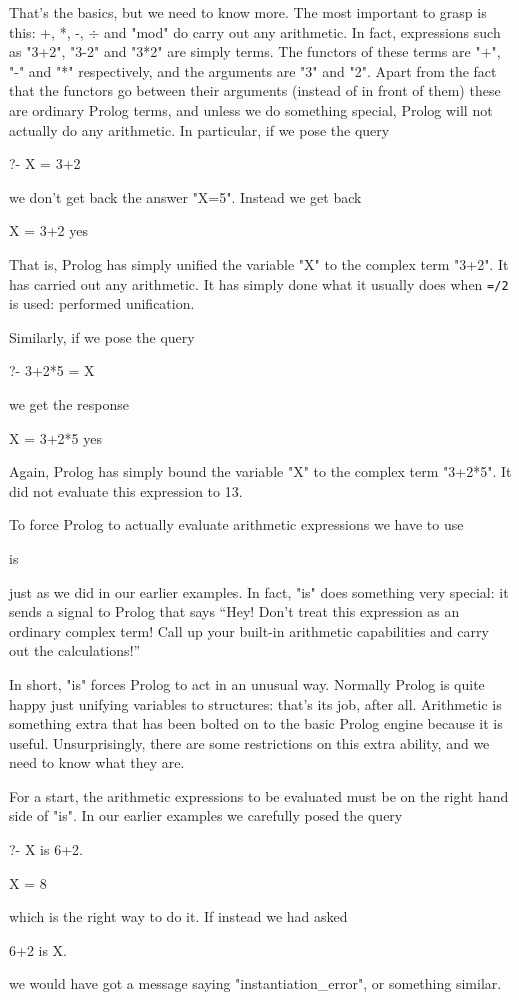 That's the basics, but we need to know more.  The most important to
grasp is this: +, *, -, $\div$ and "mod" do  carry out
any arithmetic.  In fact, expressions such as "3+2", "3-2" and "3*2"
are simply terms.  The functors of these terms are "+", "-" and "*"
respectively, and the arguments are "3" and "2".  Apart from the fact
that the functors go between their arguments (instead of in front of
them) these are ordinary Prolog terms, and unless we do something
special, Prolog will not actually do any arithmetic.  In
particular, if we pose the query
\begin{LPNcodedisplay}
?- X = 3+2
\end{LPNcodedisplay}
we don't get back the answer "X=5".
Instead we get back
\begin{LPNcodedisplay}
X = 3+2
yes
\end{LPNcodedisplay}
That is, Prolog has simply unified the variable "X" to the complex
term "3+2".  It has  carried out any arithmetic.  It has
simply done what it usually does when \texttt{=/2} is used: performed
unification.

Similarly,
if we pose the query
\begin{LPNcodedisplay}
?- 3+2*5 = X
\end{LPNcodedisplay}
we get the response
\begin{LPNcodedisplay}
X = 3+2*5
yes
\end{LPNcodedisplay}
Again, Prolog has simply bound the variable "X" to the complex
term "3+2*5".  It did not evaluate this expression to 13.

To force Prolog to actually evaluate arithmetic expressions we have to
use
        \begin{LPNcodedisplay}
is
\end{LPNcodedisplay}
just as we did in our  earlier examples.  In fact, "is" does
something very special: it sends a signal to Prolog that says ``Hey!
Don't treat this expression as an ordinary complex term!  Call up
your built-in arithmetic capabilities and carry out the calculations!''

In short, "is" forces Prolog to act in an unusual way.  Normally
Prolog is quite happy just unifying variables to structures: that's
its job, after all.  Arithmetic is something extra that has been
bolted on to the basic Prolog engine because it is useful.
Unsurprisingly, there are some restrictions on this extra ability, and
we need to know what they are.

For a start, the arithmetic expressions to be evaluated must be on
the right hand side of "is".  In our earlier examples we carefully
posed the query
\begin{LPNcodedisplay}
?- X is 6+2.

X = 8
\end{LPNcodedisplay}
which is the right way to do it. If instead we
had asked
\begin{LPNcodedisplay}
6+2 is X.
\end{LPNcodedisplay}
we would have got a message saying "instantiation_error",
or something similar.

